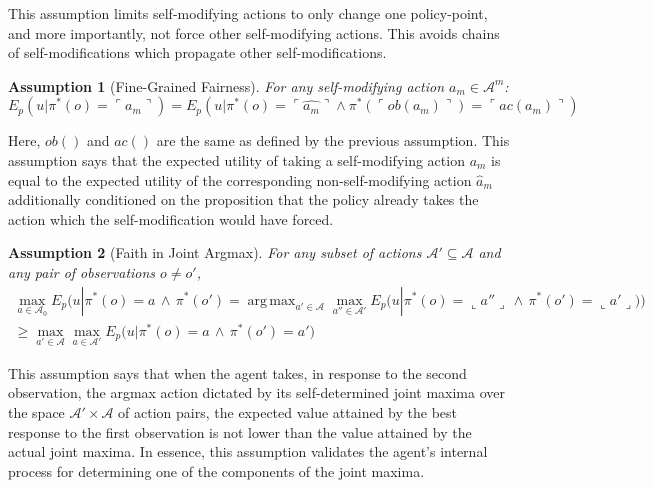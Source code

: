 \documentclass{article}
\newcommand{\qq}[1]{\ulcorner #1 \urcorner}
\newtheorem{assumption}{Assumption}
\DeclareMathOperator*{\argmax}{arg\,max}
\begin{document}
This assumption limits self-modifying actions to only change one policy-point, and more importantly, not force other self-modifying actions. This avoids chains of self-modifications which propagate other self-modifications. 

\begin{assumption}[Fine-Grained Fairness]
For any self-modifying action $a_m \in \mathcal{A}^m$:
$$ E_p(u|\pi^*(o)=\qq{a_m}) = E_p(u|\pi^*(o)=\qq{\hat {a_m}} \wedge \pi^*(\qq{ob(a_m)})=\qq{ac(a_m)}) $$
\end{assumption}

Here, $ob()$ and $ac()$ are the same as defined by the previous assumption. This assumption says that the expected utility of taking a self-modifying action $a_m$ is equal to the expected utility of the corresponding non-self-modifying action $\hat a_m$ additionally conditioned on the proposition that the policy already takes the action which the self-modification would have forced.

\begin{assumption}[Faith in Joint Argmax]
For any subset of actions $\mathcal{A}' \subseteq \mathcal{A}$ and any pair of observations $o \neq o'$,
\begin{multline*}
    \max_{a \in \mathcal{A}_0} E_p \Big( u | \pi^*(o) = a\,\land\,\pi^*(o') = \argmax_{a' \in \mathcal{A}} \max_{a'' \in \mathcal{A}'} E_p \big( u | \pi^*(o) = \llcorner a'' \lrcorner\,\land\,\pi^*(o') = \llcorner a' \lrcorner \big) \Big) \\
    \geq \max_{a' \in \mathcal{A}} \max_{a \in \mathcal{A}'} E_p \big( u | \pi^*(o) = a\,\land\,\pi^*(o') = a' \big)
\end{multline*}
\end{assumption}

This assumption says that when the agent takes, in response to the second observation, the argmax action dictated by its self-determined joint maxima over the space $\mathcal{A}' \times \mathcal{A}$ of action pairs, the expected value attained by the best response to the first observation is not lower than the value attained by the actual joint maxima. In essence, this assumption validates the agent's internal process for determining one of the components of the joint maxima. %
\end{document}
